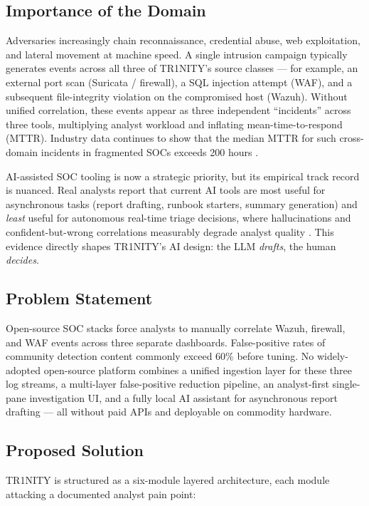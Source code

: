 \documentclass[11pt,a4paper]{article}
\begin{document}
\subsection{Importance of the Domain}
Adversaries increasingly chain reconnaissance, credential abuse, web exploitation, and lateral movement at machine speed. A single intrusion campaign typically generates events across all three of TR1NITY's source classes — for example, an external port scan (Suricata / firewall), a SQL injection attempt (WAF), and a subsequent file-integrity violation on the compromised host (Wazuh). Without unified correlation, these events appear as three independent ``incidents'' across three tools, multiplying analyst workload and inflating mean-time-to-respond (MTTR). Industry data continues to show that the median MTTR for such cross-domain incidents in fragmented SOCs exceeds 200 hours \cite{ibm2024xforce}.

AI-assisted SOC tooling is now a strategic priority, but its empirical track record is nuanced. Real analysts report that current AI tools are most useful for asynchronous tasks (report drafting, runbook starters, summary generation) and \emph{least} useful for autonomous real-time triage decisions, where hallucinations and confident-but-wrong correlations measurably degrade analyst quality \cite{darrow2024aisoc}. This evidence directly shapes TR1NITY's AI design: the LLM \emph{drafts}, the human \emph{decides}.

\subsection{Problem Statement}
\begin{problembox}
Open-source SOC stacks force analysts to manually correlate Wazuh, firewall, and WAF events across three separate dashboards. False-positive rates of community detection content commonly exceed 60\% before tuning. No widely-adopted open-source platform combines a unified ingestion layer for these three log streams, a multi-layer false-positive reduction pipeline, an analyst-first single-pane investigation UI, and a fully local AI assistant for asynchronous report drafting — all without paid APIs and deployable on commodity hardware.
\end{problembox}

\subsection{Proposed Solution}
TR1NITY is structured as a six-module layered architecture, each module attacking a documented analyst pain point:
\end{document}
